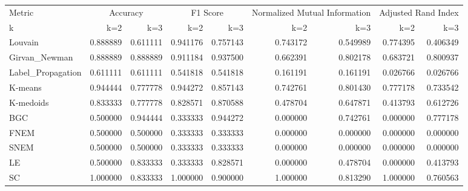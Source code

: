 \begin{tabular}{lrrrrrrrr}
\toprule
Metric & \multicolumn{2}{c}{Accuracy} & \multicolumn{2}{c}{F1 Score} & \multicolumn{2}{c}{Normalized Mutual Information} & \multicolumn{2}{c}{Adjusted Rand Index} \\
k & k=2 & k=3 & k=2 & k=3 & k=2 & k=3 & k=2 & k=3 \\
\midrule
Louvain & 0.888889 & 0.611111 & 0.941176 & 0.757143 & 0.743172 & 0.549989 & 0.774395 & 0.406349 \\
Girvan_Newman & 0.888889 & 0.888889 & 0.911184 & 0.937500 & 0.662391 & 0.802178 & 0.683721 & 0.800937 \\
Label_Propagation & 0.611111 & 0.611111 & 0.541818 & 0.541818 & 0.161191 & 0.161191 & 0.026766 & 0.026766 \\
K-means & 0.944444 & 0.777778 & 0.944272 & 0.857143 & 0.742761 & 0.801430 & 0.777178 & 0.733542 \\
K-medoids & 0.833333 & 0.777778 & 0.828571 & 0.870588 & 0.478704 & 0.647871 & 0.413793 & 0.612726 \\
BGC & 0.500000 & 0.944444 & 0.333333 & 0.944272 & 0.000000 & 0.742761 & 0.000000 & 0.777178 \\
FNEM & 0.500000 & 0.500000 & 0.333333 & 0.333333 & 0.000000 & 0.000000 & 0.000000 & 0.000000 \\
SNEM & 0.500000 & 0.500000 & 0.333333 & 0.333333 & 0.000000 & 0.000000 & 0.000000 & 0.000000 \\
LE & 0.500000 & 0.833333 & 0.333333 & 0.828571 & 0.000000 & 0.478704 & 0.000000 & 0.413793 \\
SC & 1.000000 & 0.833333 & 1.000000 & 0.900000 & 1.000000 & 0.813290 & 1.000000 & 0.760563 \\
\bottomrule
\end{tabular}
